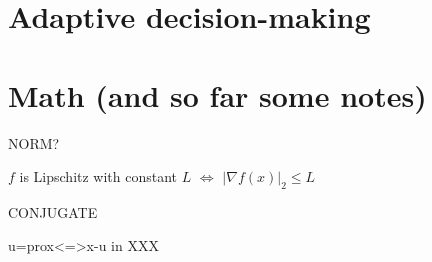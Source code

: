 \section{Adaptive decision-making}

\section{Math (and so far some notes)}

NORM?

$f$ is Lipschitz with constant $L$
$\Leftrightarrow$
$|\nabla f(x)|_2\le L$

CONJUGATE

u=prox<=>x-u in XXX
